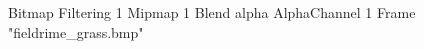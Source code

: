 {Bitmap
	{Filtering 1}
	{Mipmap 1}
	{Blend alpha}
	{AlphaChannel 1}
	{Frame "fieldrime_grass.bmp"}
}
